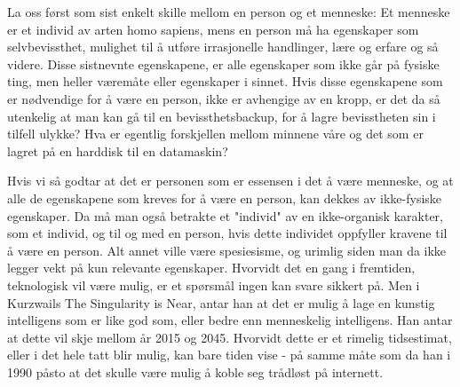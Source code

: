 La oss først som sist enkelt skille mellom en person og et menneske: Et menneske er et individ av arten homo sapiens, mens en person må ha egenskaper som selvbevissthet, mulighet til å utføre irrasjonelle handlinger, lære og erfare og så videre. Disse sistnevnte egenskapene, er alle egenskaper som ikke går på fysiske ting, men heller væremåte eller egenskaper i sinnet. Hvis disse egenskapene som er nødvendige for å være en person, ikke er avhengige av en kropp, er det da så utenkelig at man kan gå til en bevissthetsbackup, for å lagre bevisstheten sin i tilfell ulykke? Hva er egentlig forskjellen mellom minnene våre og det som er lagret på en harddisk til en datamaskin?

Hvis vi så godtar at det er personen som er essensen i det å være menneske, og at alle de egenskapene som kreves for å være en person, kan dekkes av ikke-fysiske egenskaper. Da må man også betrakte et "individ" av en ikke-organisk karakter, som et individ, og til og med en person, hvis dette individet oppfyller kravene til å være en person. Alt annet ville være spesiesisme, og urimlig siden man da ikke legger vekt på kun relevante egenskaper. Hvorvidt det en gang i fremtiden, teknologisk vil være mulig, er et spørsmål ingen kan svare sikkert på. Men i Kurzwails The Singularity is Near, antar han at det er mulig å lage en kunstig intelligens som er like god som, eller bedre enn menneskelig intelligens. Han antar at dette vil skje mellom år 2015 og 2045. Hvorvidt dette er et rimelig tidsestimat, eller i det hele tatt blir mulig, kan bare tiden vise - på samme måte som da han i 1990 påsto at det skulle være mulig å koble seg trådløst på internett.
